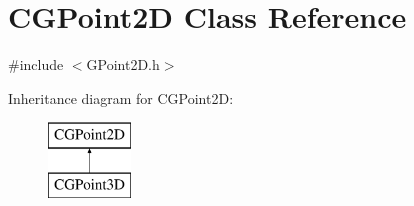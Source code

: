 \hypertarget{class_c_g_point2_d}{}\section{C\+G\+Point2\+D Class Reference}
\label{class_c_g_point2_d}


{\ttfamily \#include $<$G\+Point2\+D.\+h$>$}

Inheritance diagram for C\+G\+Point2\+D\+:\begin{figure}[H]
\begin{center}
\leavevmode
\includegraphics[height=2.000000cm]{class_c_g_point2_d}
\end{center}
\end{figure}
